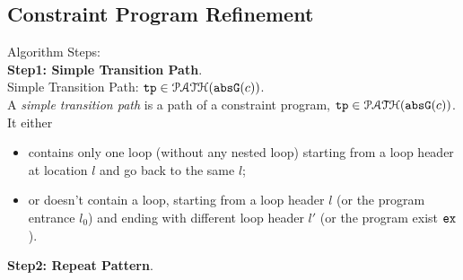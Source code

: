 \subsection{Constraint Program Refinement}
\label{sec:refine}
Algorithm Steps:
\\
\textbf{Step1: Simple Transition Path}.
\\
% 
Simple Transition Path: ${\mathtt{tp}} \in \mathcal{PATH}({\mathtt{abs}}{{\mathtt{G}}}(c))$.
\\
A \emph{simple transition path} is a path of a constraint program, ${\mathtt{tp}} \in \mathcal{PATH}({\mathtt{abs}}{{\mathtt{G}}}(c))$.
It either
\begin{itemize}
  \item contains only one loop (without any nested loop) starting from a loop header at location $l$ and go back to the same $l$;
  \item or doesn't contain a loop, starting from a loop header $l$ (or the program entrance $l_0$)
and ending with different loop header $l'$ (or the program exist ${\mathtt{ex}}$).
\end{itemize}
%
\textbf{Step2: Repeat Pattern}.
